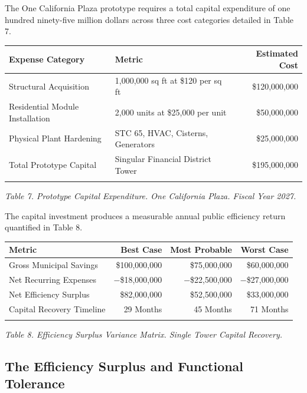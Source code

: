 \documentclass[12pt, letterpaper]{article}
\begin{document}
The One California Plaza prototype requires a total capital expenditure of one hundred ninety-five million dollars across three cost categories detailed in Table 7.

{\singlespacing
\begin{tabularx}{\textwidth}{@{}lXr@{}}
\toprule
\rowcolor{rowgray}
Expense Category & Metric & Estimated Cost \\
\midrule
Structural Acquisition & 1,000,000 sq ft at \$120 per sq ft & \$120,000,000 \\
\rowcolor{rowgray}
Residential Module Installation & 2,000 units at \$25,000 per unit & \$50,000,000 \\
Physical Plant Hardening & STC 65, HVAC, Cisterns, Generators & \$25,000,000 \\
\midrule
Total Prototype Capital & Singular Financial District Tower & \$195,000,000 \\
\addlinespace[4pt]
\bottomrule
\end{tabularx}\par
\vspace{8pt}
\noindent\textit{Table 7. Prototype Capital Expenditure. One California Plaza. Fiscal Year 2027.}
\par}
The capital investment produces a measurable annual public efficiency return quantified in Table 8.

{\singlespacing
\begin{tabularx}{\textwidth}{@{}lrrr@{}}
\toprule
\rowcolor{rowgray}
Metric & Best Case & Most Probable & Worst Case \\
\midrule
Gross Municipal Savings & \$100,000,000 & \$75,000,000 & \$60,000,000 \\
\rowcolor{rowgray}
Net Recurring Expenses & $-$\$18,000,000 & $-$\$22,500,000 & $-$\$27,000,000 \\
Net Efficiency Surplus & \$82,000,000 & \$52,500,000 & \$33,000,000 \\
\rowcolor{rowgray}
Capital Recovery Timeline & 29 Months & 45 Months & 71 Months \\
\addlinespace[4pt]
\bottomrule
\end{tabularx}\par
\vspace{8pt}
\noindent\textit{Table 8. Efficiency Surplus Variance Matrix. Single Tower Capital Recovery.}
\par}

\subsection{The Efficiency Surplus and Functional Tolerance}
\end{document}
